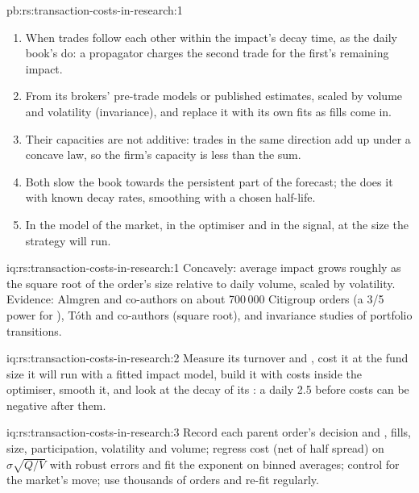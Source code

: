 \begin{solution}{pb:rs:transaction-costs-in-research:1}
\begin{enumerate}
\item When trades follow each other within the impact's decay time, as the daily book's do: a propagator charges the second trade for the first's remaining
impact.
\item From its brokers' pre-trade models or published estimates, scaled by volume and volatility (invariance), and replace it with its own fits as fills come in.
\item Their capacities are not additive: trades in the same direction add up under a concave law, so the firm's capacity is less than the sum.
\item Both slow the book towards the persistent part of the forecast; the  does it with known decay rates, smoothing with a chosen half-life.
\item In the model of the market, in the optimiser and in the signal, at the size the strategy will run.
\end{enumerate}
\end{solution}

\begin{solution}{iq:rs:transaction-costs-in-research:1}
Concavely: average impact grows roughly as the square root of the order's size relative to daily volume, scaled by volatility. Evidence: Almgren and co-authors on
about 700\,000 Citigroup orders (a 3/5 power for ), Tóth and co-authors (square root), and invariance studies of portfolio transitions.
\end{solution}

\begin{solution}{iq:rs:transaction-costs-in-research:2}
Measure its turnover and , cost it at the fund size it will run with a fitted impact model, build it with costs inside the optimiser, smooth it,
and look at the decay of its : a daily 2.5 before costs can be negative after them.
\end{solution}

\begin{solution}{iq:rs:transaction-costs-in-research:3}
Record each parent order's decision and , fills, size, participation, volatility and volume; regress cost (net of half spread) on
$\sigma\sqrt{Q/V}$ with robust errors and fit the exponent on binned averages; control for the market's move; use thousands of orders and re-fit regularly.
\end{solution}

